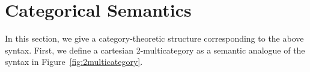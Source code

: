 \newcommand\cD{\ensuremath{\mathcal{D}}}
\newcommand\IndF[3]{\ensuremath{{#1}^\Fsymb_{{#2},{#3}}}}
\newcommand\IndU[4]{\ensuremath{{#1}^\Usymb_{{#2},{#3},{#4}}}}

\section{Categorical Semantics}
\label{sec:semantics}

In this section, we give a category-theoretic structure corresponding to
the above syntax.  First, we define a cartesian 2-multicategory as a
semantic analogue of the syntax in Figure~\ref{fig:2multicategory}. 


